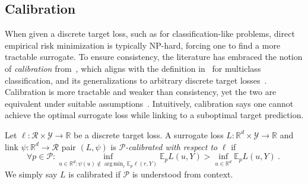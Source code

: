 \documentclass[anon,12pt]{colt2021} %
\newcommand{\reals}{\mathbb{R}}
\newcommand{\E}{\mathbb{E}}
\newcommand{\R}{\mathcal{R}}
\renewcommand{\P}{\mathcal{P}}
\newcommand{\Y}{\mathcal{Y}}
\newcommand{\exploss}[3]{\E_{#3} #1(#2,Y)}
\DeclareMathOperator*{\argmin}{arg\,min}
\begin{document}
\subsection{Calibration}\label{subsec:calibration}

When given a discrete target loss, such as for classification-like problems, direct empirical risk minimization is typically NP-hard, forcing one to find a more tractable surrogate.
To ensure consistency, the literature has embraced the notion of \emph{calibration} from~\citet[Chapter 3]{steinwart2008support}, which aligns with the definition in~\citet{tewari2007consistency} for multiclass classification, and its generalizations to arbitrary discrete target losses~\citep{agarwal2015consistent,ramaswamy2016convex}.
Calibration is more tractable and weaker than consistency, yet the two are equivalent under suitable assumptions~\citep{tewari2007consistency,ramaswamy2016convex}.
Intuitively, calibration says one cannot achieve the optimal surrogate loss while linking to a suboptimal target prediction.


\begin{definition}[Calibrated]\label{def:calibrated-finite}
	Let $\ell : \R \times \Y \to \reals$ be a discrete target loss.
	A surrogate loss $L : \reals^d \times \Y \to \reals$  and link $\psi:\reals^d \to \R$ pair $(L, \psi)$ is \emph{$\P$-calibrated with respect to} $\ell$ if 
	\begin{equation}\label{eq:calibration}
	\forall p \in \P: \inf_{u \in \reals^d : \psi(u) \not \in \argmin_r \E_p\ell(r,Y)} \exploss{L}{u}{p} > \inf_{u \in \reals^d} \exploss{L}{u}{p}~.~
	\end{equation}
	We simply say $L$ is calibrated if $\P$ is understood from context.
\end{definition}
\end{document}
